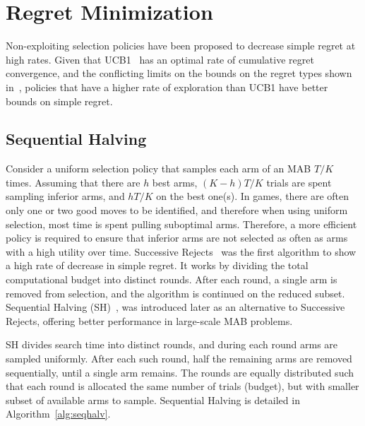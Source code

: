 \documentclass[a4paper]{llncs}
\begin{document}
\section{Regret Minimization}
\label{sec:reg_min}

Non-exploiting selection policies have been proposed to decrease simple regret at high rates. Given that UCB1~\cite{auer2002using} has an optimal rate of cumulative regret convergence, and the conflicting limits on the bounds on the regret types shown in~\cite{Bubeck11Pure}, policies that have a higher rate of exploration than UCB1  have better bounds on simple regret.

\subsection{Sequential Halving}
\label{subsec:seq_halving}

Consider a uniform selection policy that samples each arm of an MAB $T/K$ times. Assuming that there are $h$ best arms, $(K-h)T/K$ trials are spent sampling inferior arms, and $hT/K$ on the best one(s). 
In games, there are often only one or two good moves to be identified, and therefore when using uniform selection, most time is spent pulling suboptimal arms. Therefore, a more efficient policy is required to ensure that inferior arms are not selected as often as arms with a high utility over time. Successive Rejects~\cite{audibert2010best} was the first algorithm to show a high rate of decrease in simple regret. It works by dividing the total computational budget into distinct rounds. After each round, a single arm is removed from selection, and the algorithm is continued on the reduced subset. Sequential Halving (SH)~\cite{Karnin13SH}, was introduced later as an alternative to Successive Rejects, offering better performance in large-scale MAB problems.

SH divides search time into distinct rounds, and during each round arms are sampled uniformly. After each such round, half the remaining arms are removed sequentially, until a single arm remains. The rounds are equally distributed such that each round is allocated the same number of trials (budget), but with smaller subset of available arms to sample. Sequential Halving is detailed in Algorithm~\ref{alg:seqhalv}.
\end{document}
